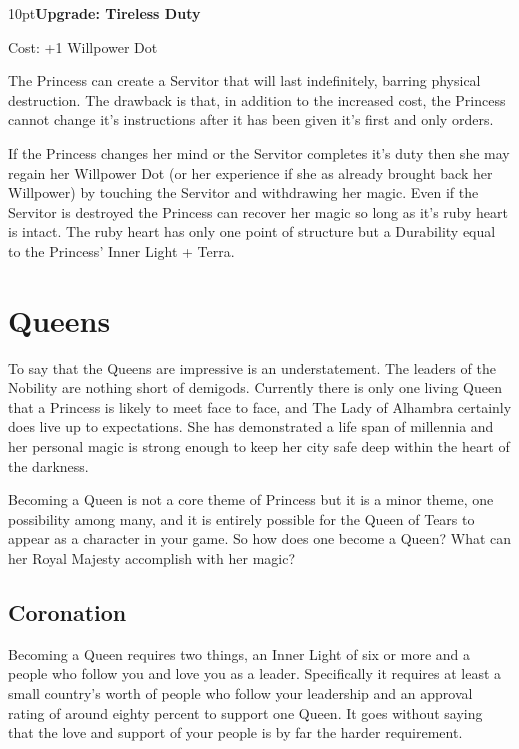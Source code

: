 \begin{myindentpar}{10pt}\textbf{Upgrade: Tireless Duty}

Cost: +1 Willpower Dot

The Princess can create a Servitor that will last indefinitely, barring physical destruction. The drawback is that, in addition to the increased cost, the Princess cannot change it's instructions after it has been given it's first and only orders.

If the Princess changes her mind or the Servitor completes it's duty then she may regain her Willpower Dot (or her experience if she as already brought back her Willpower) by touching the Servitor and withdrawing her magic. Even if the Servitor is destroyed the Princess can recover her magic so long as it's ruby heart is intact. The ruby heart has only one point of structure but a Durability equal to the Princess' Inner Light + Terra. \end{myindentpar}




\section*{Queens}
\label{sec:Queens}

To say that the Queens are impressive is an understatement. The leaders of the Nobility are nothing short of demigods. Currently there is only one living Queen that a Princess is likely to meet face to face, and The Lady of Alhambra certainly does live up to expectations. She has demonstrated a life span of millennia and her personal magic is strong enough to keep her city safe deep within the heart of the darkness. 

Becoming a Queen is not a core theme of Princess but it is a minor theme, one possibility among many, and it is entirely possible for the Queen of Tears to appear as a character in your game. So how does one become a Queen? What can her Royal Majesty accomplish with her magic? 

\subsection*{Coronation}
Becoming a Queen requires two things, an Inner Light of six or more and a people who follow you and love you as a leader. Specifically it requires at least a small country's worth of people who follow your leadership and an approval rating of around eighty percent to support one Queen. It goes without saying that the love and support of your people is by far the harder requirement. 

